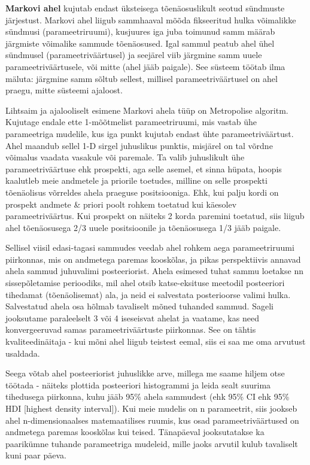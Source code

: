 \documentclass[]{book}
\begin{document}
\textbf{Markovi ahel} kujutab endast üksteisega tõenäosuslikult seotud sündmuste järjestust. Markovi ahel liigub sammhaaval mõõda fikseeritud hulka võimalikke sündmusi (parameetriruumi), kusjuures iga juba toimunud samm määrab järgmiste võimalike sammude tõenäosused. Igal sammul peatub ahel ühel sündmusel (parameetriväärtusel) ja seejärel viib järgmine samm uuele parameetriväärtusele, või mitte (ahel jääb paigale). See süsteem töötab ilma mäluta: järgmine samm sõltub sellest, millisel parameetriväärtusel on ahel praegu, mitte süsteemi ajaloost.

Lihtsaim ja ajalooliselt esimene Markovi ahela tüüp on Metropolise algoritm. Kujutage endale ette 1-mõõtmelist parameetriruumi, mis vastab ühe parameetriga mudelile, kus iga punkt kujutab endast ühte parameetriväärtust. Ahel maandub sellel 1-D sirgel juhuslikus punktis, misjärel on tal võrdne võimalus vaadata vasakule või paremale. Ta valib juhuslikult ühe parameetriväärtuse ehk prospekti, aga selle asemel, et sinna hüpata, hoopis kaalutleb meie andmetele ja priorile toetudes, milline on selle prospekti tõenäolisus võrreldes ahela praeguse positsiooniga. Ehk, kui palju kordi on prospekt andmete \& priori poolt rohkem toetatud kui käesolev parameetriväärtus. Kui prospekt on näiteks 2 korda paremini toetatud, siis liigub ahel tõenäosusega 2/3 uuele positsioonile ja tõenäosusega 1/3 jääb paigale.

Sellisel viisil edasi-tagasi sammudes veedab ahel rohkem aega parameetriruumi piirkonnas, mis on andmetega paremas kooskõlas, ja pikas perspektiivis annavad ahela sammud juhuvalimi posteeriorist. Ahela esimesed tuhat sammu loetakse nn sissepõletamise perioodiks, mil ahel otsib katse-eksituse meetodil posteeriori tihedamat (tõenäolisemat) ala, ja neid ei salvestata posterioorse valimi hulka. Salvestatud ahela osa hõlmab tavaliselt mõned tuhanded sammud. Sageli jooksutame paraleelselt 3 või 4 iseseisvat ahelat ja vaatame, kas need konvergeeruvad samas parameetriväärtuste piirkonnas. See on tähtis kvaliteedinäitaja - kui mõni ahel liigub teistest eemal, siis ei saa me oma arvutust usaldada.

Seega võtab ahel posteeriorist juhuslikke arve, millega me saame hiljem otse töötada - näiteks plottida posteeriori histogrammi ja leida sealt suurima tihedusega piirkonna, kuhu jääb 95\% ahela sammudest (ehk 95\% CI ehk 95\% HDI {[}highest density interval{]}). Kui meie mudelis on n parameetrit, siis jookseb ahel n-dimensionaalses matemaatilises ruumis, kus osad parameetriväärtused on andmetega paremas kooskõlas kui teised. Tänapäeval jooksutatakse ka paarikümne tuhande parameetriga mudeleid, mille jaoks arvutil kulub tavaliselt kuni paar päeva.
\end{document}
